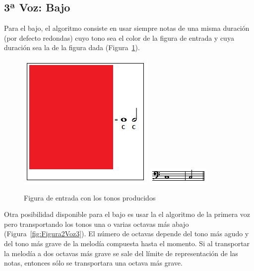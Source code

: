 
\subsection{3ª Voz: Bajo}

Para el bajo, el algoritmo consiste en usar siempre notas de una misma duración (por defecto redondas) cuyo tono sea el color de la figura de entrada y cuya duración sea la de la figura dada (Figura~\ref{fig:Figura1Voz3}).

		\begin{figure}[htbp]
		\centering
		\hspace*{0.0in}
		\includegraphics[scale=1]{graphics/simpletest2-F2F3.png}
		\includegraphics[scale=1]{graphics/simpletest2-BASSpartitura.png}
		\caption{Figura de entrada con los tonos producidos}
		\label{fig:Figura1Voz3}
		\end{figure}

Otra posibilidad disponible para el bajo es usar la el algoritmo de la primera voz pero transportando los tonos una o varias octavas más abajo (Figura~\ref{fig:Figura2Voz3}). El número de octavas depende del tono más agudo y del tono más grave de la melodía compuesta hasta el momento. Si al transportar la melodía a dos octavas más grave se sale del límite de representación de las notas, entonces sólo se transportara una octava más grave.

